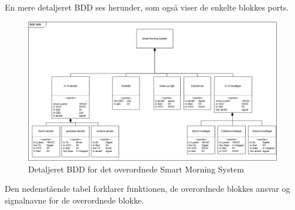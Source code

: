 \documentclass[11pt]{article}
\begin{document}
En mere detaljeret BDD ses herunder, som også viser de enkelte blokkes ports.\newline

\begin{figure}[!ht]
	\centering
	\includegraphics[width=\textwidth]{Bdd-sms.png}
	\caption{Detaljeret BDD for det overordnede Smart Morning System}
	\label{fig: Detaljeret BDD}
\end{figure}
\pagebreak


Den nedenstående tabel forklarer funktionen, de overordnede blokkes ansvar og signalnavne for de overordnede blokke.
\end{document}
